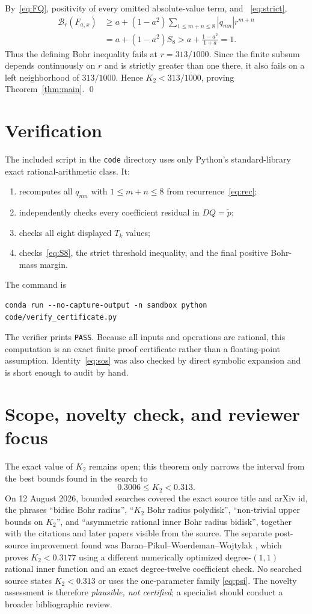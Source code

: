 \documentclass[11pt]{article}
\newcommand{\Bmass}{\mathcal B}
\begin{document}
By~\eqref{eq:FQ}, positivity of every omitted absolute-value term, and
~\eqref{eq:strict},
\begin{align*}
 \Bmass_r(F_{a,x})
 &\geq a+(1-a^2)\sum_{1\leq m+n\leq8}|q_{mn}|r^{m+n}\\
 &=a+(1-a^2)S_8
 >a+\frac{1-a^2}{1+a}=1.
\end{align*}
Thus the defining Bohr inequality fails at $r=313/1000$.  Since the finite
subsum depends continuously on $r$ and is strictly greater than one there,
it also fails on a left neighborhood of $313/1000$.  Hence
$K_2<313/1000$, proving Theorem~\ref{thm:main}. \qed

\section{Verification}

The included script in the \texttt{code} directory uses only Python's
standard-library exact rational-arithmetic class.  It:
\begin{enumerate}
\item recomputes all $q_{mn}$ with $1\leq m+n\leq8$ from
      recurrence~\eqref{eq:rec};
\item independently checks every coefficient residual in $DQ=\widetilde p$;
\item checks all eight displayed $T_k$ values;
\item checks~\eqref{eq:S8}, the strict threshold inequality, and the final
      positive Bohr-mass margin.
\end{enumerate}
The command is
\begin{verbatim}
conda run --no-capture-output -n sandbox python code/verify_certificate.py
\end{verbatim}
The verifier prints \texttt{PASS}.  Because all inputs and operations are
rational, this computation is an exact finite proof certificate rather than
a floating-point assumption.  Identity~\eqref{eq:sos} was also checked by
direct symbolic expansion and is short enough to audit by hand.

\section{Scope, novelty check, and reviewer focus}

The exact value of $K_2$ remains open; this theorem only narrows the interval
from the best bounds found in the search to
\[
 0.3006\leq K_2<0.313.
\]
On 12 August 2026, bounded searches covered the exact source title and arXiv
id, the phrases ``bidisc Bohr radius'', ``$K_2$ Bohr radius polydisk'',
``non-trivial upper bounds on $K_2$'', and ``asymmetric rational inner Bohr
radius bidisk'', together with the citations and later papers visible from
the source.  The separate post-source improvement found was
Baran--Pikul--Woerdeman--Wojtylak \cite[Theorem 6.4]{BaranEtAl}, which proves
$K_2<0.3177$ using a different numerically optimized degree-$(1,1)$
rational inner function and an exact degree-twelve coefficient check.
No searched source states $K_2<0.313$ or uses the one-parameter family
\eqref{eq:psi}.  The novelty assessment is therefore \emph{plausible, not
certified}; a specialist should conduct a broader bibliographic review.
\end{document}

